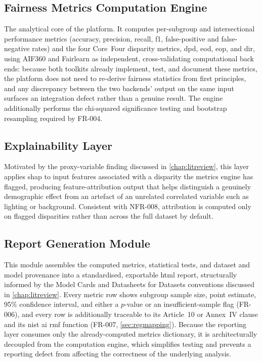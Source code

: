 \subsection{Fairness Metrics Computation Engine}
The analytical core of the platform. It computes per-subgroup and intersectional performance metrics (accuracy, precision, recall, \gls{f1}, false-positive and false-negative rates) and the four Core~Four disparity metrics, \gls{dpd}, \gls{eod}, \gls{eop}, and \gls{dir}, using AIF360 and Fairlearn as independent, cross-validating computational back ends: because both toolkits already implement, test, and document these metrics, the platform does not need to re-derive fairness statistics from first principles, and any discrepancy between the two backends' output on the same input surfaces an integration defect rather than a genuine result. The engine additionally performs the chi-squared significance testing and bootstrap resampling required by FR-004.

\subsection{Explainability Layer}
Motivated by the proxy-variable finding discussed in \cref{chap:litreview}, this layer applies \gls{shap} to input features associated with a disparity the metrics engine has flagged, producing feature-attribution output that helps distinguish a genuinely demographic effect from an artefact of an unrelated correlated variable such as lighting or background. Consistent with NFR-008, attribution is computed only on flagged disparities rather than across the full dataset by default.

\subsection{Report Generation Module}
This module assembles the computed metrics, statistical tests, and dataset and model provenance into a standardised, exportable \gls{html} report, structurally informed by the Model Cards and Datasheets for Datasets conventions discussed in \cref{chap:litreview}. Every metric row shows subgroup sample size, point estimate, 95\% confidence interval, and either a $p$-value or an insufficient-sample flag (FR-006), and every row is additionally traceable to its Article~10 or Annex~IV clause and its \gls{nist} \gls{ai} \gls{rmf} function (FR-007, \cref{sec:regmapping}). Because the reporting layer consumes only the already-computed metrics dictionary, it is architecturally decoupled from the computation engine, which simplifies testing and prevents a reporting defect from affecting the correctness of the underlying analysis.


